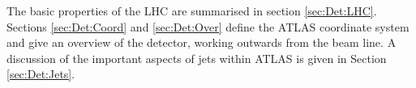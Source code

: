 The basic properties of the LHC are summarised in section \ref{sec:Det:LHC}. 
Sections \ref{sec:Det:Coord} and \ref{sec:Det:Over} define the ATLAS coordinate system and give an overview of the detector, working outwards from the beam line.
A discussion of the important aspects of jets within ATLAS is given in Section \ref{sec:Det:Jets}.
